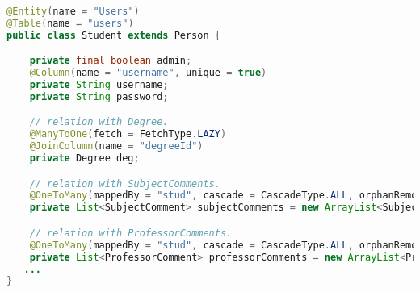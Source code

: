\begin{lstlisting}[language=Java,  basicstyle=\footnotesize]
@Entity(name = "Users")
@Table(name = "users")
public class Student extends Person {

	private final boolean admin;
	@Column(name = "username", unique = true)
	private String username;
	private String password;

	// relation with Degree.
	@ManyToOne(fetch = FetchType.LAZY)
	@JoinColumn(name = "degreeId")
	private Degree deg;

	// relation with SubjectComments.
	@OneToMany(mappedBy = "stud", cascade = CascadeType.ALL, orphanRemoval = true)
	private List<SubjectComment> subjectComments = new ArrayList<SubjectComment>();

	// relation with ProfessorComments.
	@OneToMany(mappedBy = "stud", cascade = CascadeType.ALL, orphanRemoval = true)
	private List<ProfessorComment> professorComments = new ArrayList<ProfessorComment>();
   ...
}
\end{lstlisting}